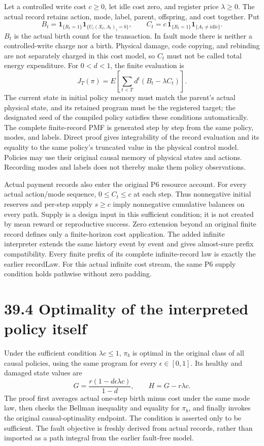 \documentclass[
  english,
  11pt,
  oneside]{book}
\begin{document}
Let a controlled write cost \(c\ge0\), let idle cost zero, and register price \(\lambda\ge0\). The actual record retains action, mode, label, parent, offspring, and cost together. Put \[B_t=\mathbf1_{\{R_t=1\}}\mathbf1_{\{U_i(X_t,A_t)_i=b\}},\qquad
C_t=c\,\mathbf1_{\{R_t=1\}}\mathbf1_{\{A_t\ne\mathrm{idle}\}}.\] \(B_t\) is the actual birth count for the transaction. In fault mode there is neither a controlled-write charge nor a birth. Physical damage, code copying, and rebinding are not separately charged in this cost model, so \(C_t\) must not be called total energy expenditure. For \(0<d<1\), the finite evaluation is \[J_T(\pi)=E\!\left[\sum_{t<T}d^t(B_t-\lambda C_t)\right].\] The current state in initial policy memory must match the parent's actual physical state, and its retained program must be the registered target; the designated seed of the compiled policy satisfies these conditions automatically. The complete finite-record PMF is generated step by step from the same policy, modes, and labels. Direct proof gives integrability of the record evaluation and its equality to the same policy's truncated value in the physical control model. Policies may use their original causal memory of physical states and actions. Recording modes and labels does not thereby make them policy observations.

Actual payment records also enter the original P6 resource account. For every actual action/mode sequence, \(0\le C_t\le c\) at each step. Thus nonnegative initial reserves and per-step supply \(s\ge c\) imply nonnegative cumulative balances on every path. Supply is a design input in this sufficient condition; it is not created by mean reward or reproductive success. Zero extension beyond an original finite record defines only a finite-horizon cost application. The added infinite interpreter extends the same history event by event and gives almost-sure prefix compatibility. Every finite prefix of its complete infinite-record law is exactly the earlier recordLaw. For this actual infinite cost stream, the same P6 supply condition holds pathwise without zero padding.

\section{39.4 Optimality of the interpreted policy itself}\label{optimality-of-the-interpreted-policy-itself}

Under the sufficient condition \(\lambda c\le1\), \(\pi_b\) is optimal in the original class of all causal policies, using the same program for every \(\epsilon\in[0,1]\). Its healthy and damaged state values are \[G=\frac{r(1-d\epsilon\lambda c)}{1-d},\qquad H=G-r\lambda c.\] The proof first averages actual one-step birth minus cost under the same mode law, then checks the Bellman inequality and equality for \(\pi_b\), and finally invokes the original causal-optimality endpoint. The condition is asserted only to be sufficient. The fault objective is freshly derived from actual records, rather than imported as a path integral from the earlier fault-free model.
\end{document}
